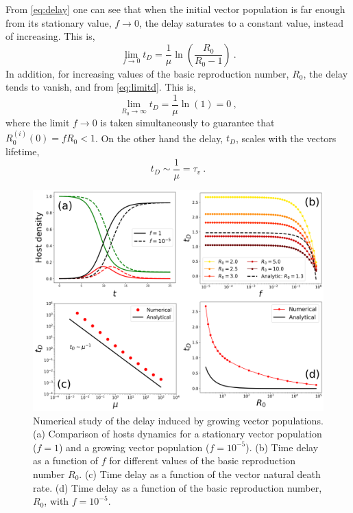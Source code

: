 From \cref{eq:delay} one can see that when the initial vector population
is far enough from its stationary value, $f\rightarrow 0$, the delay saturates
to a constant value, instead of increasing. This is,
\begin{equation}
    \lim_{f\to0}t_D=\frac{1}{\mu}\ln(\frac{R_0}{R_0-1}) \ .
    \label{eq:limitd}
\end{equation}
In addition, for increasing values of the basic reproduction number, $R_0$,
the delay tends to vanish, and from \cref{eq:limitd}. This is,
\begin{equation}
    \label{eq:limit_tD_infty}
    \lim_{R_0\to\infty}t_D=\frac{1}{\mu}\ln(1)=0\ ,
\end{equation}
where the limit $f\rightarrow 0$ is taken simultaneously to guarantee that
$R_0^{(i)}(0)=f R_0<1$. On the other hand the delay, $t_D$, scales with the
vectors lifetime,
\begin{equation}
    t_D\sim\frac{1}{\mu}=\tau_v \ .
\end{equation}

\begin{figure}[H]
    \centering
    \includegraphics[width=1\textwidth]{Figures/delay.pdf}
    \caption[Numerical study of the delay induced by growing vector
    populations]{Numerical study of the delay induced by growing vector
    populations. (a) Comparison of hosts dynamics for a stationary vector
    population ($f=1$) and a growing vector population ($f=10^{-5}$). (b) Time
    delay as a function of $f$ for different values of the basic reproduction
    number $R_0$. (c) Time delay as a function of the vector natural death
    rate. (d) Time delay as a function of the basic reproduction number, $R_0$,
    with $f=10^{-5}$.}
    \label{fig:delay}
\end{figure}

